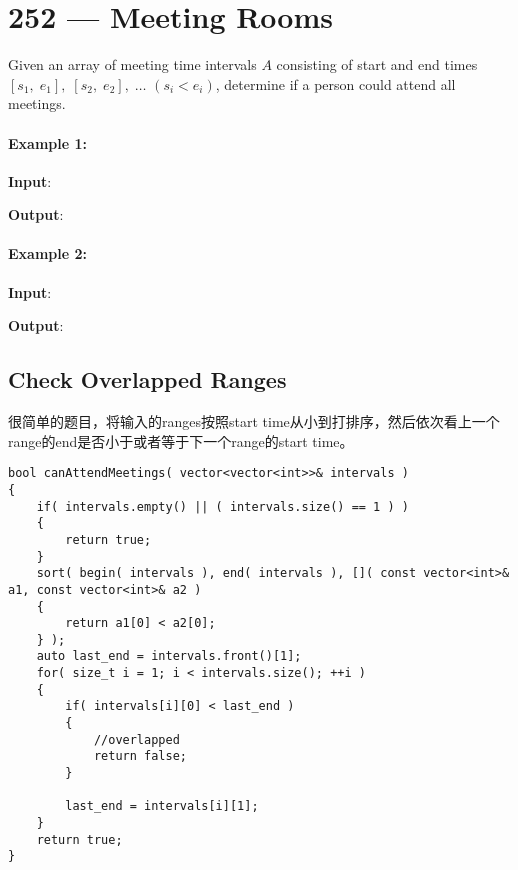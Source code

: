 \section{252 --- Meeting Rooms}
Given an array of meeting time intervals $A$ consisting of start and end times $[s_1,\;e_1],\;[s_2,\;e_2],\;\ldots$ $(s_i < e_i)$, determine if a person could attend all meetings.

\paragraph{Example 1:}

\begin{flushleft}
\textbf{Input}: \fcj{[[0,30],[5,10],[15,20]]}

\textbf{Output}: 

\end{flushleft}

\paragraph{Example 2:}

\begin{flushleft}
\textbf{Input}: \fcj{[[7,10],[2,4]]}

\textbf{Output}: 
\end{flushleft}

\subsection{Check Overlapped Ranges}
很简单的题目，将输入的ranges按照start time从小到打排序，然后依次看上一个range的end是否小于或者等于下一个range的start time。

\setcounter{lstlisting}{0}
\begin{lstlisting}[style=customc, caption={Sort}]
bool canAttendMeetings( vector<vector<int>>& intervals )
{
    if( intervals.empty() || ( intervals.size() == 1 ) )
    {
        return true;
    }
    sort( begin( intervals ), end( intervals ), []( const vector<int>& a1, const vector<int>& a2 )
    {
        return a1[0] < a2[0];
    } );
    auto last_end = intervals.front()[1];
    for( size_t i = 1; i < intervals.size(); ++i )
    {
        if( intervals[i][0] < last_end )
        {
            //overlapped
            return false;
        }

        last_end = intervals[i][1];
    }
    return true;
}
\end{lstlisting}